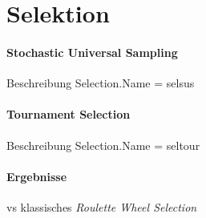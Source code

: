 \section{Selektion}\label{selection}


\paragraph{Stochastic Universal Sampling}
Beschreibung
Selection.Name = selsus

\paragraph{Tournament Selection}
Beschreibung
Selection.Name = seltour

\paragraph{Ergebnisse}
vs klassisches \emph{Roulette Wheel Selection}




